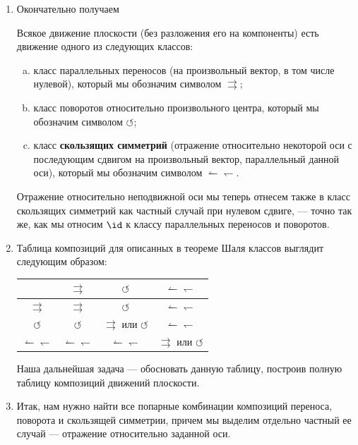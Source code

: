 \begin{enumerate}
\item Окончательно получаем
\begin{thrm}[Шаля] Всякое движение плоскости (без разложения его на компоненты) есть движение одного из следующих классов:
\begin{enumerate}[a)]
\item класс параллельных переносов (на произвольный вектор, в том числе нулевой), который мы обозначим символом $\rightrightarrows$;
\item класс поворотов относительно произвольного центра, который мы обозначим символом
$\circlearrowleft$;
\item класс \textbf{скользящих симметрий} (отражение относительно некоторой оси с последующим сдвигом на произвольный вектор, параллельный данной оси), который мы обозначим символом
$\leftharpoonup\leftharpoondown$.
\end{enumerate}
\end{thrm}
Отражение относительно неподвижной оси мы теперь отнесем также в класс скользящих симметрий как частный случай при нулевом сдвиге, --- точно так же, как мы относим $\id$ к классу параллельных переносов и поворотов.



\item Таблица композиций для описанных в теореме Шаля классов выглядит следующим образом:
\begin{center}
\begin{tabular}{c|ccc}
 & $\rightrightarrows$ & $\circlearrowleft$ &  $\leftharpoonup\leftharpoondown$ \\ \hline
$\rightrightarrows$ & $\rightrightarrows$ &  $\circlearrowleft$ &  $\leftharpoonup\leftharpoondown$  \\ 
$\circlearrowleft$ & $\circlearrowleft$ & $\rightrightarrows$ или $\circlearrowleft$ & $\leftharpoonup\leftharpoondown$  \\ 
$\leftharpoonup\leftharpoondown$ & $\leftharpoonup\leftharpoondown$ & $\leftharpoonup\leftharpoondown$ & $\rightrightarrows$ или $\circlearrowleft$  \\ 
\end{tabular}
\end{center}

Наша дальнейшая задача --- обосновать данную таблицу, построив полную таблицу композиций движений плоскости.

\item Итак, нам нужно найти все попарные комбинации композиций переноса, поворота и скользящей симметрии, причем мы выделим отдельно частный ее случай --- отражение относительно заданной оси.


\end{enumerate}
